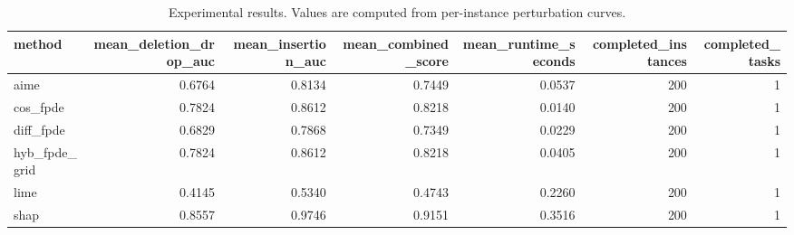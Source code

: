 \begin{table}[t]
\caption{Experimental results. Values are computed from per-instance perturbation curves.}
\label{tab:main_results_computed}
\centering
\begin{tabular}{lrrrrrr}
\toprule
method & mean\_deletion\_drop\_auc & mean\_insertion\_auc & mean\_combined\_score & mean\_runtime\_seconds & completed\_instances & completed\_tasks \\
\midrule
aime & 0.6764 & 0.8134 & 0.7449 & 0.0537 & 200 & 1 \\
cos\_fpde & 0.7824 & 0.8612 & 0.8218 & 0.0140 & 200 & 1 \\
diff\_fpde & 0.6829 & 0.7868 & 0.7349 & 0.0229 & 200 & 1 \\
hyb\_fpde\_grid & 0.7824 & 0.8612 & 0.8218 & 0.0405 & 200 & 1 \\
lime & 0.4145 & 0.5340 & 0.4743 & 0.2260 & 200 & 1 \\
shap & 0.8557 & 0.9746 & 0.9151 & 0.3516 & 200 & 1 \\
\bottomrule
\end{tabular}

\end{table}
